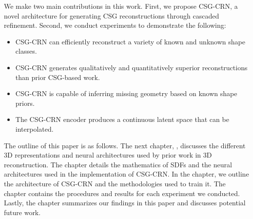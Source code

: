 We make two main contributions in this work. First, we propose CSG-CRN, a novel architecture for generating CSG reconstructions through cascaded refinement. Second, we conduct experiments to demonstrate the following:

\begin{itemize}
	\item CSG-CRN can efficiently reconstruct a variety of known and unknown shape classes.
	\item CSG-CRN generates qualitatively and quantitatively superior reconstructions than prior CSG-based work.
	\item CSG-CRN is capable of inferring missing geometry based on known shape priors.
	\item The CSG-CRN encoder produces a continuous latent space that can be interpolated.
\end{itemize}

\vspace{1em}

The outline of this paper is as follows. The next chapter, , discusses the different 3D representations and neural architectures used by prior work in 3D reconstruction. The  chapter details the mathematics of SDFs and the neural architectures used in the implementation of CSG-CRN. In the  chapter, we outline the architecture of CSG-CRN and the methodologies used to train it. The  chapter contains the procedures and results for each experiment we conducted. Lastly, the  chapter summarizes our findings in this paper and discusses potential future work.

